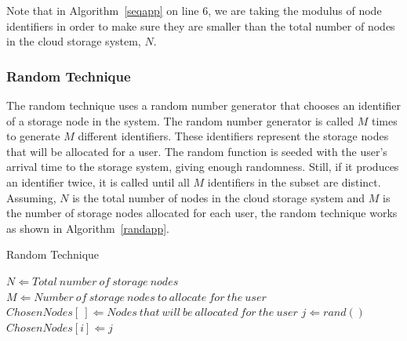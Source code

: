 Note that in Algorithm~\ref{seqapp} on line 6, we are taking the modulus of node identifiers in order to
make sure they are smaller than the total number of nodes in the cloud
storage system, $N$.

\subsubsection{Random Technique}
The random technique uses a random number generator that chooses an identifier of a storage node
in the system. The random number generator is called $M$ times to generate $M$ different identifiers.
These identifiers represent the storage nodes that will be allocated for a user. The
random function is seeded with the user's arrival time to the storage system, giving enough
randomness. Still, if it produces an identifier twice, it is called until all $M$ identifiers
in the subset are distinct. Assuming, $N$ is the total number of nodes in the
cloud storage system and $M$ is the number of storage nodes allocated for each user, the random
technique works as shown in Algorithm~\ref{randapp}.

\begin{algorithm}[!htbp]
\caption{Random Technique}
\label{randapp}
\begin{algorithmic}[1]
    \STATE $N \Leftarrow Total\ number\ of\ storage\ nodes$
    \STATE $M \Leftarrow Number\ of\ storage\ nodes\ to\ allocate\ for\ the\ user$
    \STATE $ChosenNodes[\ ] \Leftarrow Nodes\ that\ will\ be\ allocated\ for\ the\ user$
            \STATE $j \Leftarrow rand()$
        \ENDWHILE
        \STATE $ChosenNodes[i] \Leftarrow j$
    \ENDFOR
\end{algorithmic}
\end{algorithm}

